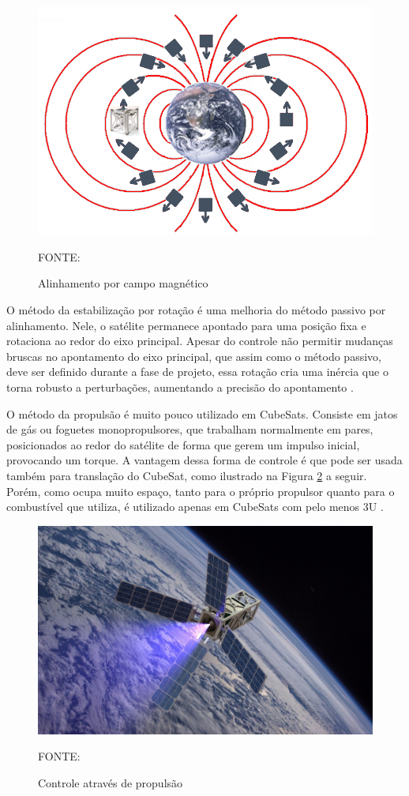 \documentclass[
	12pt,				%
	openany,			%
	twoside,			%
	a4paper,			%
	english,			%
	french,				%
	spanish,			%
	brazil,				%
	oldfontcommands
	]{abntex2}
\begin{document}
\begin{figure}[th]
	\caption{Alinhamento por campo magnético}
	\centering
	\includegraphics[width=0.8\linewidth]{./figs/Mag_Field}
	
	\begin{small}
		FONTE: \cite{FrancLav}
	\end{small}
	\label{fig:Mag_Field}
\end{figure}

O método da estabilização por rotação é uma melhoria do método passivo por alinhamento. Nele, o satélite permanece apontado para uma posição fixa e rotaciona ao redor do eixo principal. Apesar do controle não permitir mudanças bruscas no apontamento do eixo principal, que assim como o método passivo, deve ser definido durante a fase de projeto, essa rotação cria uma inércia que o torna robusto a perturbações, aumentando a precisão do apontamento \cite{FrancLav}.

O método da propulsão é muito pouco utilizado em CubeSats. Consiste em jatos de gás ou foguetes monopropulsores, que trabalham normalmente em pares, posicionados ao redor do satélite de forma que gerem um impulso inicial, provocando um torque. A vantagem dessa forma de controle é que pode ser usada também para translação do CubeSat, como ilustrado na Figura \ref{fig:Propulsion} a seguir. Porém, como ocupa muito espaço, tanto para o próprio propulsor quanto para o combustível que utiliza, é utilizado apenas em CubeSats com pelo menos 3U \cite{Luka}.

\begin{figure}[th]
	\caption{Controle através de propulsão}
	\centering
	\includegraphics[width=0.8\linewidth]{./figs/Propulsion}
	
	\begin{small}
		FONTE: \cite{Prop}
	\end{small}
	\label{fig:Propulsion}
\end{figure}
\end{document}
